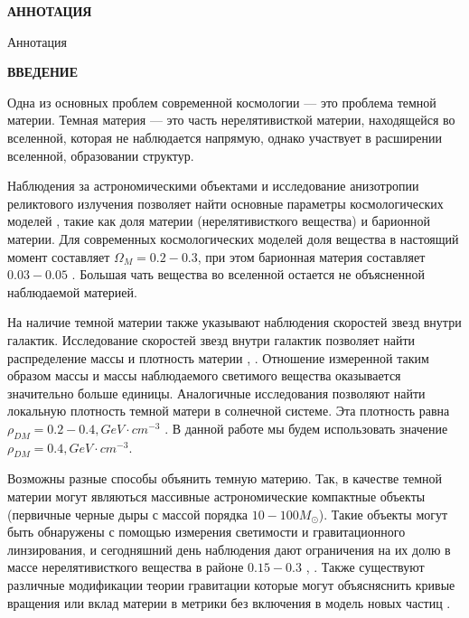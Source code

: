 \newpage
\begin{center}
  \textbf{\large АННОТАЦИЯ}
\end{center}

Аннотация

\onehalfspacing
\setcounter{page}{2}

\newpage
\renewcommand{\contentsname}{\centerline{\large СОДЕРЖАНИЕ}}
\tableofcontents

\newpage
\begin{center}
  \textbf{\large ВВЕДЕНИЕ}
\end{center}


Одна из основных проблем современной космологии --- это проблема темной материи.  Темная материя --- это часть нерелятивисткой материи, находящейся во вселенной, которая не наблюдается напрямую, однако участвует в расширении вселенной, образовании структур. 


Наблюдения за астрономическими объектами и исследование анизотропии реликтового излучения позволяет найти основные параметры космологических моделей , такие как доля материи (нерелятивисткого вещества) и барионной материи. Для современных космологических моделей доля вещества в настоящий момент составляет $\Omega_M = 0.2-0.3$, при этом барионная материя составляет $0.03-0.05$ \cite{Cao_2023}. Большая чать вещества во вселенной остается не объясненной наблюдаемой материей.

На наличие темной материи также указывают наблюдения скоростей звезд внутри галактик. Исследование скоростей звезд внутри галактик позволяет найти распределение массы и плотность материи \cite{Radial_velocity_measurements}, \cite{Angular_Velocity}. Отношение измеренной таким образом массы и массы наблюдаемого светимого вещества оказывается значительно больше единицы. Аналогичные исследования позволяют найти локальную плотность темной матери в солнечной системе. Эта плотность равна $\rho_{DM} = 0.2 - 0.4, GeV \cdot cm^{-3}$ \cite{palau2022oblateness}. В данной работе мы будем использовать значение  $\rho_{DM} = 0.4, GeV \cdot  cm^{-3}$.


Возможны разные способы объянить темную материю. Так, в качестве темной материи могут являються массивные астрономические компактные объекты (первичные черные дыры с массой порядка $10-100M_{\odot}$). Такие объекты могут быть обнаружены с помощью измерения светимости и гравитационного линзирования, и сегодняшний день наблюдения дают ограничения на их долю в массе нерелятивисткого вещества в районе $0.15-0.3$ \cite{Zumalac_rregui_2018}, \cite{Blaineau_2022}.
Также существуют различные модификации теории гравитации которые могут объясняснить кривые вращения или вклад материи в метрики без включения в модель новых частиц \cite{1984ApJ...286....7B}.


